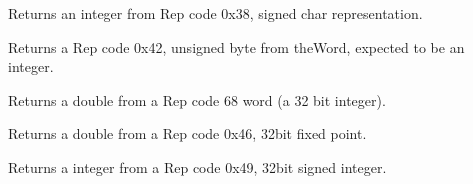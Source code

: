\documentclass[letterpaper,10pt,english]{sphinxmanual}
\begin{document}

\begin{fulllineitems}
\label{\detokenize{ref/LIS/core/RepCode:TotalDepth.LIS.core.pRepCode.from56}}
Returns an integer from Rep code 0x38, signed char representation.

\end{fulllineitems}


\begin{fulllineitems}
\label{\detokenize{ref/LIS/core/RepCode:TotalDepth.LIS.core.pRepCode.from66}}
Returns a Rep code 0x42, unsigned byte from theWord, expected to be an integer.

\end{fulllineitems}


\begin{fulllineitems}
\label{\detokenize{ref/LIS/core/RepCode:TotalDepth.LIS.core.pRepCode.from68}}
Returns a double from a Rep code 68 word (a 32 bit integer).

\end{fulllineitems}


\begin{fulllineitems}
\label{\detokenize{ref/LIS/core/RepCode:TotalDepth.LIS.core.pRepCode.from70}}
Returns a double from a Rep code 0x46, 32bit fixed point.

\end{fulllineitems}


\begin{fulllineitems}
\label{\detokenize{ref/LIS/core/RepCode:TotalDepth.LIS.core.pRepCode.from73}}
Returns a integer from a Rep code 0x49, 32bit signed integer.

\end{fulllineitems}
\end{document}
